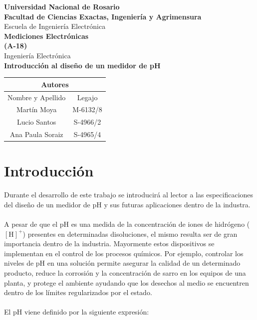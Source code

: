 \documentclass[10pt,a4paper]{article}
\begin{document}
\begin{titlepage}
\begin{center}
 \large{ \textbf{Universidad Nacional de Rosario}} \\[5mm]
 \textbf{Facultad de Ciencias Exactas, Ingeniería y Agrimensura} \\[5mm]
 Escuela de Ingeniería Electrónica \\[20mm]
 \Large {\textbf{Mediciones Electrónicas\\(A-18)}}\\[1.5mm]
 \small {Ingeniería Electrónica} \\[20mm]
 \LARGE{ \textbf{Introducción al diseño de un medidor de pH}} \\[15mm]

\end{center}
\vspace{10pt}
	
\begin{center}
\begin{tabular}{|c|c|}
\hline 
\multicolumn{2}{|c|}{Autores} \\ 
\hline 
Nombre y Apellido & Legajo \\ 
\hline 
Martín Moya  & M-6132/8 \\
\hline 
Lucio Santos & S-4966/2 \\  
\hline 
Ana Paula Soraiz & S-4965/4\\
\hline
\end{tabular}
\end{center}
\vfill

\end{titlepage}

\tableofcontents

\clearpage

\section{Introducción}

Durante el desarrollo de este trabajo se introducirá al lector a las especificaciones del diseño de un medidor de pH y sus futuras aplicaciones dentro de la industra.\\
\\
A pesar de que el pH es una medida de la concentración de iones de hidrógeno ($\mathrm{\left[H\right]^+}$) presentes en determinadas disoluciones, el mismo resulta ser de gran importancia dentro de la industria. Mayormente estos dispositivos se implementan en el control de los procesos químicos. Por ejemplo, controlar los niveles de pH en una solución permite asegurar la calidad de un determinado producto, reduce la corrosión y la concentración de sarro en los equipos de una planta, y protege el ambiente ayudando que los desechos al medio se encuentren dentro de los límites regularizados por el estado.\\
\\
El pH viene definido por la siguiente expresión:
\end{document}
